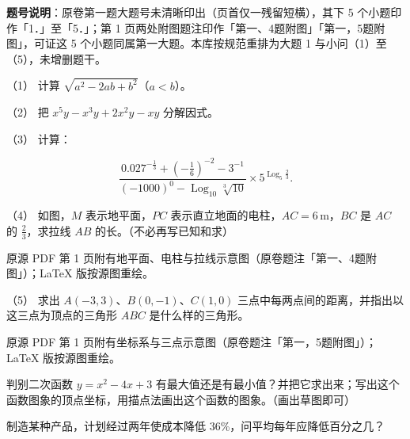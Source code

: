 \Needspace{0.4\textheight}
\begin{question}

\begin{gktip}
\textbf{题号说明}：原卷第一题大题号未清晰印出（页首仅一残留短横），其下 5 个小题印作「1．」至「5．」；第 1 页两处附图题注印作「第一、4题附图」「第一，5题附图」，可证这 5 个小题同属第一大题。本库按规范重排为大题 1 与小问（1）至（5），未增删题干。
\end{gktip}

（1） 计算 $\sqrt{a^2-2ab+b^2}$（$a<b$）。

（2） 把 $x^5y-x^3y+2x^2y-xy$ 分解因式。

（3） 计算：

\nopagebreak[4]
\[
\frac{0.027^{-\frac13}+\left(-\frac16\right)^{-2}-3^{-1}}{(-1000)^0-\operatorname{Log}_{10}\sqrt[3]{10}}\times 5^{\operatorname{Log}_5\frac23}.
\]

（4） 如图，$M$ 表示地平面，$PC$ 表示直立地面的电柱，$AC=6\,\mathrm{m}$，$BC$ 是 $AC$ 的 $\frac23$，求拉线 $AB$ 的长。（不必再写已知和求）

\begin{gktip}
原源 PDF 第 1 页附有地平面、电柱与拉线示意图（原卷题注「第一、4题附图」）；LaTeX 版按源图重绘。
\end{gktip}
\nopagebreak[4]
\begin{center}\end{center}
\nopagebreak[4]
（5） 求出 $A(-3,3)$、$B(0,-1)$、$C(1,0)$ 三点中每两点间的距离，并指出以这三点为顶点的三角形 $ABC$ 是什么样的三角形。

\begin{gktip}
原源 PDF 第 1 页附有坐标系与三点示意图（原卷题注「第一，5题附图」）；LaTeX 版按源图重绘。
\end{gktip}
\nopagebreak[4]
\begin{center}\end{center}
\nopagebreak[4]
\end{question}
\begin{question}
判别二次函数 $y=x^2-4x+3$ 有最大值还是有最小值？并把它求出来；写出这个函数图象的顶点坐标，用描点法画出这个函数的图象。（画出草图即可）

\end{question}
\begin{question}
制造某种产品，计划经过两年使成本降低 36\%，问平均每年应降低百分之几？

\end{question}
